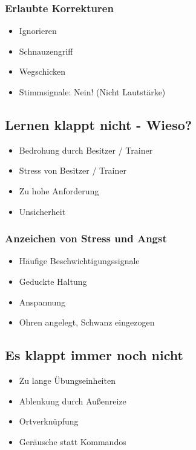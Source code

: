         \subsubsection{Erlaubte Korrekturen}
            \begin{itemize}
                \item Ignorieren
                \item Schnauzengriff
                \item Wegschicken
                \item Stimmsignale: \glqq Nein!\grqq{} (Nicht Lautstärke)
            \end{itemize}

    \subsection{Lernen klappt nicht - Wieso?}
        \begin{itemize}
            \item Bedrohung durch Besitzer / Trainer
            \item Stress von Besitzer / Trainer
            \item Zu hohe Anforderung
            \item Unsicherheit
        \end{itemize}

        \subsubsection{Anzeichen von Stress und Angst}
            \begin{itemize}
                \item Häufige Beschwichtigungssignale
                \item Geduckte Haltung
                \item Anspannung
                \item Ohren angelegt, Schwanz eingezogen
            \end{itemize}

    \subsection{Es klappt immer noch nicht}
        \begin{itemize}
            \item Zu lange Übungseinheiten
            \item Ablenkung durch Außenreize
            \item Ortverknüpfung
            \item \glqq Geräusche\grqq{} statt Kommandos
        \end{itemize}

